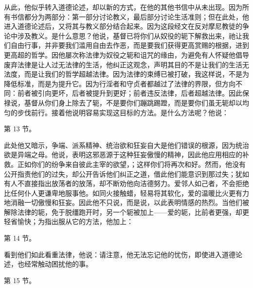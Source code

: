 从此，他似乎转入道德论述，却以新的方式，在他的其他书信中从未出现。因为所有书信都分为两部分：第一部分讨论教义，最后部分讨论生活准则；但在此处，他进入道德论述后，又将其与教义部分结合起来。因为这段经文在反对摩尼教徒的争论中涉及教义。是什么意思？他说，基督已将你们从奴役的轭下解救出来，祂让我们自由行事，并非要我们滥用自由去作恶，而是要我们获得更高赏赐的根据，进到更高超的哲学。因他屡次称法律为奴役之轭和诅咒的缘由，为避免有人怀疑他倡导废弃法律是让人过无法律的生活，他纠正这观念，声明其目的不是让我们的生活无法度，而是让我们的哲学超越法律。因为法律的束缚已被打破，我这样说，不是为降低标准，而是为提升它。因为行淫者和守贞者都越过了法律的界限，但方向不同：前者被引向更坏，后者被提升到更好；前者违反法律，后者超越法律。因此保禄说，基督从你们身上除去了轭，不是要你们蹦跳踢蹬，而是要你们虽无轭却以均匀的步伐前行。接着他说明容易实现这目标的方法。是什么方法呢？他说：\par

第 13 节。\newline{}\newline{}\par

此处他又暗示，争端、派系精神、统治欲和狂妄自大是他们错误的根源，因为统治欲是异端之母。他说，表明这邪恶源于这种狂妄傲慢的精神，因此他应用相应的补救。正如你们的纷争来自彼此主宰的欲望，；这样你们将再次和好。然而，他没有公开指责他们的过失，却公开告诉他们纠正之道，借此他们能意识到那过失；犹如有人不直接指出放荡者的放荡，却不断劝他向洁德努力。爱邻人如己者，不会拒绝比任何仆人更谦卑地服事他。如同火接触蜡，轻易将其软化，爱的温暖比火更有力地消融一切傲慢和狂妄。因此他不只说，而是说，以此表明情感的热烈。当他们被解除法律的轭，免于脱缰跑开时，另一个轭被加上——爱的轭，比前者更强，却更轻省愉快；为指出服从它的方法，他加上：\par

第 14 节。\newline{}\newline{}\par

看到他们如此看重法律，他说：请注意，他无法忘记他的忧伤，即使进入道德论述，也经常触动困扰他的事。\par

第 15 节。\newline{}\newline{}\par

